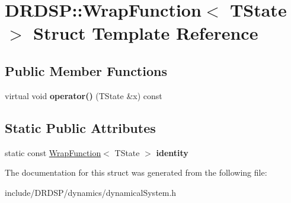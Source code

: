 \hypertarget{struct_d_r_d_s_p_1_1_wrap_function}{\section{D\-R\-D\-S\-P\-:\-:Wrap\-Function$<$ T\-State $>$ Struct Template Reference}
\label{struct_d_r_d_s_p_1_1_wrap_function}
}
\subsection*{Public Member Functions}
\begin{DoxyCompactItemize}
\item 
\hypertarget{struct_d_r_d_s_p_1_1_wrap_function_a0f13da3a6bb99181925b5d51eb4038e9}{virtual void {\bfseries operator()} (T\-State \&x) const }\label{struct_d_r_d_s_p_1_1_wrap_function_a0f13da3a6bb99181925b5d51eb4038e9}

\end{DoxyCompactItemize}
\subsection*{Static Public Attributes}
\begin{DoxyCompactItemize}
\item 
\hypertarget{struct_d_r_d_s_p_1_1_wrap_function_a5246f6950e2a2ded2892e6d9ee937310}{static const \hyperlink{struct_d_r_d_s_p_1_1_wrap_function}{Wrap\-Function}$<$ T\-State $>$ {\bfseries identity}}\label{struct_d_r_d_s_p_1_1_wrap_function_a5246f6950e2a2ded2892e6d9ee937310}

\end{DoxyCompactItemize}


The documentation for this struct was generated from the following file\-:\begin{DoxyCompactItemize}
\item 
include/\-D\-R\-D\-S\-P/dynamics/dynamical\-System.\-h\end{DoxyCompactItemize}

